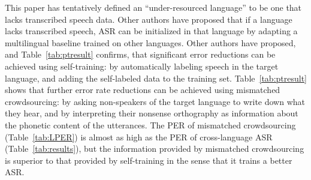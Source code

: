 This paper has tentatively defined an ``under-resourced language'' to
be one that lacks transcribed speech data.  Other authors have
proposed that if a language lacks transcribed speech, ASR can be
initialized in that language by adapting a multilingual baseline
trained on other languages.  Other authors have proposed, and
Table~\ref{tab:ptresult} confirms, that significant error reductions
can be achieved using self-training: by automatically labeling speech
in the target language, and adding the self-labeled data to the
training set.  Table~\ref{tab:ptresult} shows that
further error rate reductions can be achieved using mismatched
crowdsourcing: by asking non-speakers of the target language to write
down what they hear, and by interpreting their nonsense orthography as
information about the phonetic content of the utterances.  The PER of
mismatched crowdsourcing (Table~\ref{tab:LPER}) is almost as high as
the PER of cross-language ASR (Table~\ref{tab:results}), but the
information provided by mismatched crowdsourcing is superior to that
provided by self-training in the sense that it trains a better ASR.

